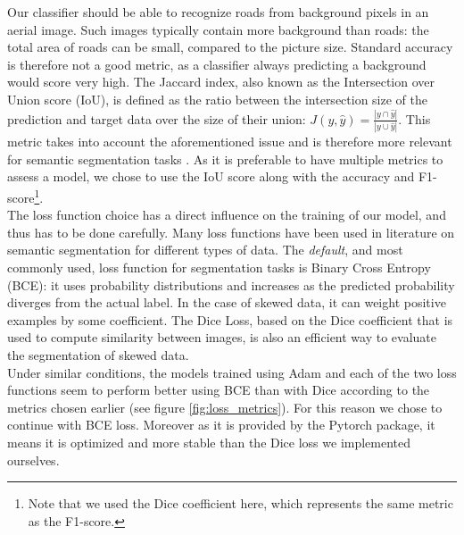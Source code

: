 \documentclass[10pt,conference,compsocconf]{IEEEtran}
\begin{document}
Our classifier should be able to recognize roads from background pixels in an aerial image. Such images typically contain more background than roads: the total area of roads can be small, compared to the picture size. Standard accuracy is therefore not a good metric, as a classifier always predicting a background would score very high. The Jaccard index, also known as the Intersection over Union score (IoU), is defined as the ratio between the intersection size of the prediction and target data over the size of their union: $J(y, \hat{y}) = \frac{|y \cap \hat{y}|}{|y \cup \hat{y}|}$. This metric takes into account the aforementioned issue and is therefore more relevant for semantic segmentation tasks \cite{reitsam_2020}. As it is preferable to have multiple metrics to assess a model, we chose to use the IoU score along with the accuracy and F1-score\footnote{Note that we used the Dice coefficient here, which represents the same metric as the F1-score.}. \\

The loss function choice has a direct influence on the training of our model, and thus has to be done carefully. Many loss functions have been used in literature on semantic segmentation \cite{loss_functions} for different types of data. The \emph{default}, and most commonly used, loss function for segmentation tasks is Binary Cross Entropy (BCE): it uses probability distributions and increases as the predicted probability diverges from the actual label. In the case of skewed data, it can weight positive examples by some coefficient. The Dice Loss, based on the Dice coefficient that is used to compute similarity between images, is also an efficient way to evaluate the segmentation of skewed data. \\

Under similar conditions, the models trained using Adam and each of the two loss functions seem to perform better using BCE than with Dice according to the metrics chosen earlier (see figure \ref{fig:loss_metrics}). For this reason we chose to continue with BCE loss. Moreover as it is provided by the Pytorch package, it means it is optimized and more stable than the Dice loss we implemented ourselves.  
\end{document}
